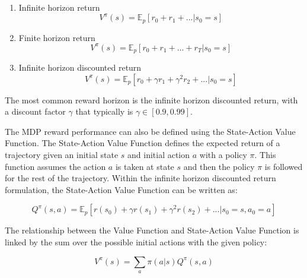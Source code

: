 \documentclass[11pt]{article}
\begin{document}
\begin{enumerate}
    \item Infinite horizon return
    \begin{equation}
        V^{\pi}(s) = \mathbb{E}_p [r_0 + r_1 + ... | s_0 = s]
    \end{equation}
    \item Finite horizon return
    \begin{equation}
        V^{\pi}(s) = \mathbb{E}_p [r_0 + r_1 + ... + r_T | s_0 = s]
    \end{equation}
    \item Infinite horizon discounted return
    \begin{equation}
        V^{\pi}(s) = \mathbb{E}_p [r_0 + \gamma r_1 + \gamma^2 r_2+  ... | s_0 = s]
    \end{equation}
\end{enumerate}

The most common reward horizon is the infinite horizon discounted return, with a discount factor $\gamma$ that typically is $\gamma \in [0.9, 0.99]$.

The MDP reward performance can also be defined using the State-Action Value Function. The State-Action Value Function defines the expected return of a trajectory given an initial state $s$ and initial action $a$ with a policy $\pi$. This function assumes the action $a$ is taken at state $s$ and then the policy $\pi$ is followed for the rest of the trajectory. Within the infinite horizon discounted return formulation, the State-Action Value Function can be written as:

\begin{equation}
    Q^{\pi}(s,a) = \mathbb{E}_p [r(s_0) + \gamma r(s_1) + \gamma^2 r(s_2) +  ... | s_0 = s, a_0 = a]
\end{equation}

The relationship between the Value Function and State-Action Value Function is linked by the sum over the possible initial actions with the given policy:

\begin{equation}
    V^{\pi}(s) = \sum_a \pi(a|s) Q^{\pi}(s,a)
\end{equation}


\end{document}
